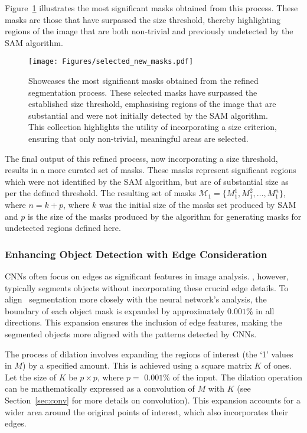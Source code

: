 Figure~\ref{Fig:selected_new} illustrates the most significant masks obtained from this process. These masks are those that have surpassed the size threshold, thereby highlighting regions of the image that are both non-trivial and previously undetected by the SAM algorithm.
\begin{figure}[ht!]
\begin{center}
\texttt{[image: Figures/selected\_new\_masks.pdf]}
\end{center}
\caption{Showcases the most significant masks obtained from the refined segmentation process. These selected masks have surpassed the established size threshold, emphasising regions of the image that are substantial and were not initially detected by the SAM algorithm. This collection highlights the utility of incorporating a size criterion, ensuring that only non-trivial, meaningful areas are selected.}
\label{Fig:selected_new}
\end{figure} 

The final output of this refined process, now incorporating a size threshold, results in a more curated set of masks. These masks represent significant regions which were not identified by the SAM algorithm, but are of substantial size as per the defined threshold. The resulting set of masks $\mathcal{M}_1 = \{M_1^1, M_1^2, \ldots, M_1^n\}$, where $n = k + p$, where $k$ was the initial size of the masks set produced by SAM and $p$ is the size of the masks produced by the algorithm for generating masks for undetected regions defined here.

\subsubsection{Enhancing Object Detection with Edge Consideration}

CNNs often focus on edges as significant features in image analysis. \SAM, however, typically segments objects without incorporating these crucial edge details. To align \SAM\ segmentation more closely with the neural network's analysis, the boundary of each object mask is expanded by approximately $0.001\%$ in all directions. This expansion ensures the inclusion of edge features, making the segmented objects more aligned with the patterns detected by CNNs.

The process of dilation involves expanding the regions of interest (the `1' values in $M$) by a specified amount. This is achieved using a square matrix $K$ of ones. Let the size of $K$ be $p \times p$, where $p =$  $0.001\%$ of the input. The dilation operation can be mathematically expressed as a convolution of $M$ with $K$ (see Section~\ref{sec:conv} for more details on convolution). This expansion accounts for a wider area around the original points of interest, which also incorporates their edges.

